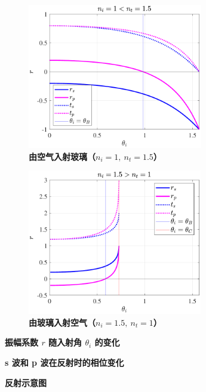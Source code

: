 \documentclass[UTF8]{report}
\theoremstyle{MyLineTheoremStyle} %
\theoremstyle{MyBlockTheoremStyle} %
\theoremstyle{MySubsubsectionStyle} %
\begin{document}
\begin{figure}[H]\centering
\begin{subfigure}[t]{0.49\textwidth}\centering
    \includegraphics[height=180pt]{assets/2024-09-15_10-53-31.pdf}
    \caption{\bfseries 由空气入射玻璃（$n_i = 1,\ n_t = 1.5$） }
\end{subfigure}
\begin{subfigure}[t]{0.49\textwidth}\centering
    \includegraphics[height=180pt]{assets/2024-09-15_10-53-27.pdf}
    \caption{\bfseries 由玻璃入射空气（$n_i = 1.5,\ n_t = 1$） }
\end{subfigure}
\caption{\bfseries 振幅系数 $r$ 随入射角 $\theta_i$ 的变化 }\label{振幅系数随入射角的变化}
\end{figure}

\begin{figure}[ht]\centering
    
    \caption{\bfseries s 波和 p 波在反射时的相位变化}\label{反射时 s 波和 p 波的相位变化}
\end{figure}

\begin{figure}[H]\centering

\caption{\bfseries 反射示意图}\label{反射示意图}
\end{figure}
\end{document}
